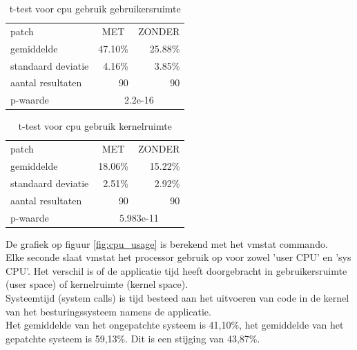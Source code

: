 \begin{table}[]
	\centering
	\caption{t-test voor cpu gebruik gebruikersruimte}
	\label{t_cpu_us}
	\begin{tabular}{l|rr}
		\hline
		patch              & \multicolumn{1}{c}{MET} & \multicolumn{1}{c}{ZONDER} \\
		gemiddelde         & 47.10\%                 & 25.88\%                    \\
		standaard deviatie & 4.16\%                  & 3.85\%                     \\
		aantal resultaten  & 90                      & 90                         \\ \hline
		p-waarde           & \multicolumn{2}{c|}{2.2e-16}                        
	\end{tabular}
\end{table}


\begin{table}[]
	\centering
	\caption{t-test voor cpu gebruik kernelruimte}
	\label{t_cpu_sys}
	\begin{tabular}{l|rr}
		\hline
		patch              & \multicolumn{1}{c}{MET} & \multicolumn{1}{c}{ZONDER} \\
		gemiddelde         & 18.06\%                 & 15.22\%                    \\
		standaard deviatie & 2.51\%                  & 2.92\%                     \\
		aantal resultaten  & 90                      & 90                         \\ \hline
		p-waarde           & \multicolumn{2}{c|}{5.983e-11}                      
	\end{tabular}
\end{table}


De grafiek op figuur \ref{fig:cpu_usage} is berekend met het vmstat commando.\\
Elke seconde slaat vmstat het processor gebruik op voor zowel 'user CPU' en 'sys CPU'.
Het verschil is of de applicatie tijd heeft doorgebracht in gebruikersruimte (user space) of kernelruimte (kernel space).\\
Systeemtijd (system calls) is tijd besteed aan het uitvoeren van code in de kernel van het besturingssysteem namens de applicatie.\\
Het gemiddelde van het ongepatchte systeem is 41,10\%, het gemiddelde van het gepatchte systeem is 59,13\%. Dit is een stijging van 43,87\%.\\

